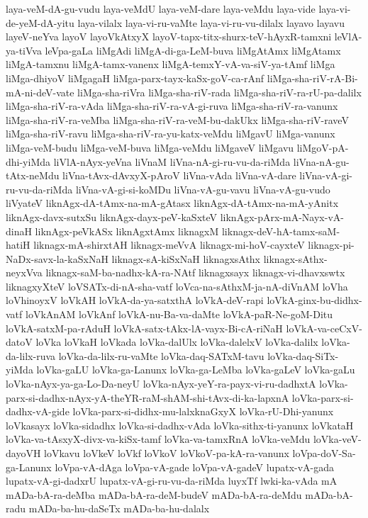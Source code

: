 {laya-veM-dA-gu-vudu
laya-veMdU
laya-veM-dare
laya-veMdu
laya-vide
laya-vi-de-yeM-dA-yitu
laya-vilalx
laya-vi-ru-vaMte
laya-vi-ru-vu-dilalx
layavo
layavu
layeV-neYva
layoV
layoVkAtxyX
layoV-tapx-titx-shurx-teV-hAyxR-tamxni
leVlA-ya-tiVva
leVpa-gaLa
liMgAdi
liMgA-di-ga-LeM-buva
liMgAtAmx
liMgAtamx
liMgA-tamxnu
liMgA-tamx-vanenx
liMgA-temxY-vA-va-siV-ya-tAmf
liMga
liMga-dhiyoV
liMgagaH
liMga-parx-tayx-kaSx-goV-ca-rAnf
liMga-sha-riV-rA-Bi-mA-ni-deV-vate
liMga-sha-riVra
liMga-sha-riV-rada
liMga-sha-riV-ra-rU-pa-dalilx
liMga-sha-riV-ra-vAda
liMga-sha-riV-ra-vA-gi-ruva
liMga-sha-riV-ra-vanunx
liMga-sha-riV-ra-veMba
liMga-sha-riV-ra-veM-bu-dakUkx
liMga-sha-riV-raveV
liMga-sha-riV-ravu
liMga-sha-riV-ra-yu-katx-veMdu
liMgavU
liMga-vanunx
liMga-veM-budu
liMga-veM-buva
liMga-veMdu
liMgaveV
liMgavu
liMgoV-pA-dhi-yiMda
liVlA-nAyx-yeVna
liVnaM
liVna-nA-gi-ru-vu-da-riMda
liVna-nA-gu-tAtx-neMdu
liVna-tAvx-dAvxyX-pAroV
liVna-vAda
liVna-vA-dare
liVna-vA-gi-ru-vu-da-riMda
liVna-vA-gi-si-koMDu
liVna-vA-gu-vavu
liVna-vA-gu-vudo
liVyateV
liknAgx-dA-tAmx-na-mA-gAtasx
liknAgx-dA-tAmx-na-mA-yAnitx
liknAgx-davx-sutxSu
liknAgx-dayx-peV-kaSxteV
liknAgx-pArx-mA-Nayx-vA-dinaH
liknAgx-peVkASx
liknAgxtAmx
liknagxM
liknagx-deV-hA-tamx-saM-hatiH
liknagx-mA-shirxtAH
liknagx-meVvA
liknagx-mi-hoV-cayxteV
liknagx-pi-NaDx-savx-la-kaSxNaH
liknagx-sA-kiSxNaH
liknagxsAthx
liknagx-sAthx-neyxVva
liknagx-saM-ba-nadhx-kA-ra-NAtf
liknagxsayx
liknagx-vi-dhavxswtx
liknagxyXteV
loVSATx-di-nA-sha-vatf
loVca-na-sAthxM-ja-nA-diVnAM
loVha
loVhinoyxV
loVkAH
loVkA-da-ya-satxthA
loVkA-deV-rapi
loVkA-ginx-bu-didhx-vatf
loVkAnAM
loVkAnf
loVkA-nu-Ba-va-daMte
loVkA-paR-Ne-goM-Ditu
loVkA-satxM-pa-rAduH
loVkA-satx-tAkx-lA-vayx-Bi-cA-riNaH
loVkA-va-ceCxV-datoV
loVka
loVkaH
loVkada
loVka-dalUlx
loVka-dalelxV
loVka-dalilx
loVka-da-lilx-ruva
loVka-da-lilx-ru-vaMte
loVka-daq-SATxM-tavu
loVka-daq-SiTx-yiMda
loVka-gaLU
loVka-ga-Lanunx
loVka-ga-LeMba
loVka-gaLeV
loVka-gaLu
loVka-nAyx-ya-ga-Lo-Da-neyU
loVka-nAyx-yeY-ra-payx-vi-ru-dadhxtA
loVka-parx-si-dadhx-nAyx-yA-theYR-raM-shAM-shi-tAvx-di-ka-lapxnA
loVka-parx-si-dadhx-vA-gide
loVka-parx-si-didhx-mu-lalxknaGxyX
loVka-rU-Dhi-yanunx
loVkasayx
loVka-sidadhx
loVka-si-dadhx-vAda
loVka-sithx-ti-yanunx
loVkataH
loVka-va-tAsxyX-divx-va-kiSx-tamf
loVka-va-tamxRnA
loVka-veMdu
loVka-veV-dayoVH
loVkavu
loVkeV
loVkf
loVkoV
loVkoV-pa-kA-ra-vanunx
loVpa-doV-Sa-ga-Lanunx
loVpa-vA-dAga
loVpa-vA-gade
loVpa-vA-gadeV
lupatx-vA-gada
lupatx-vA-gi-dadxrU
lupatx-vA-gi-ru-vu-da-riMda
luyxTf
lwki-ka-vAda
mA
mADa-bA-ra-deMba
mADa-bA-ra-deM-budeV
mADa-bA-ra-deMdu
mADa-bA-radu
mADa-ba-hu-daSeTx
mADa-ba-hu-dalalx
}
